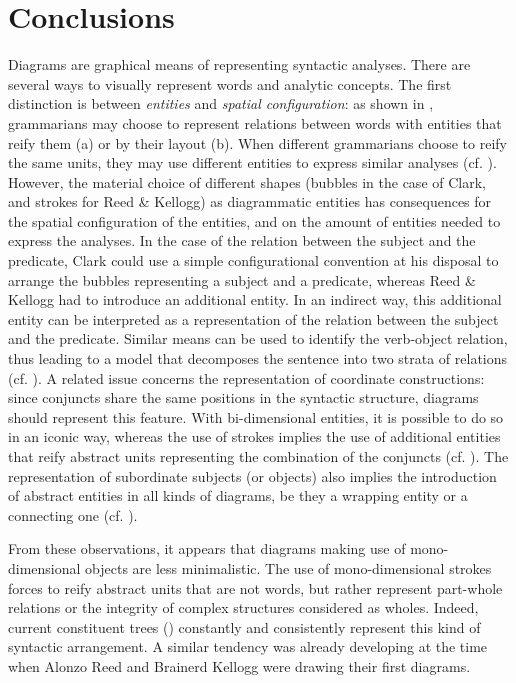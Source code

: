 \documentclass[english,output=paper,colorlinks,citecolor=brown]{../langscibook}
\begin{document}
\section{Conclusions}\label{sec:4:5}

Diagrams are graphical means of representing syntactic analyses. There are several ways to visually represent words and analytic concepts. The first distinction is between \textit{entities} and \textit{spatial configuration}: as shown in , grammarians may choose to represent relations between words with entities that reify them (a) or by their layout (b). When different grammarians choose to reify the same units, they may use different entities to express similar analyses (cf. ). However, the material choice of different shapes (bubbles in the case of Clark, and strokes for Reed \& Kellogg) as diagrammatic entities has consequences for the spatial configuration of the entities, and on the amount of entities needed to express the analyses. In the case of the relation between the subject and the predicate, Clark could use a simple configurational convention at his disposal to arrange the bubbles representing a subject and a predicate, whereas Reed \& Kellogg had to introduce an additional entity. In an indirect way, this additional entity can be interpreted as a representation of the relation between the subject and the predicate. Similar means can be used to identify the verb-object relation, thus leading to a model that decomposes the sentence into two strata of relations (cf. ). A related issue concerns the representation of coordinate constructions: since conjuncts share the same positions in the syntactic structure, diagrams should represent this feature. With bi-dimensional entities, it is possible to do so in an iconic way, whereas the use of strokes implies the use of additional entities that reify abstract units representing the combination of the conjuncts (cf. ). The representation of subordinate subjects (or objects) also implies the introduction of abstract entities in all kinds of diagrams, be they a wrapping entity or a connecting one (cf. ). 

From these observations, it appears that diagrams making use of mono-di\-men\-sio\-nal objects are less minimalistic. The use of mono-dimensional strokes forces to reify abstract units that are not words, but rather represent part-whole relations or the integrity of complex structures considered as wholes. Indeed, current constituent trees () constantly and consistently represent this kind of syntactic arrangement. A similar tendency was already developing at the time when Alonzo Reed and Brainerd Kellogg were drawing their first diagrams.
\end{document}

